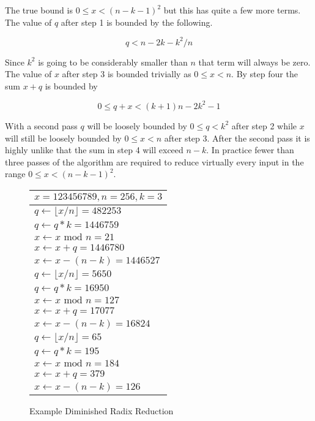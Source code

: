 \documentclass[b5paper]{book}
\begin{document}
The true bound is  $0 \le x < (n - k - 1)^2$ but this has quite a few more terms.  The value of $q$ after step 1 is bounded by the following.

\begin{equation}
q < n - 2k - k^2/n
\end{equation}

Since $k^2$ is going to be considerably smaller than $n$ that term will always be zero.  The value of $x$ after step 3 is bounded trivially as
$0 \le x < n$.  By step four the sum $x + q$ is bounded by 

\begin{equation}
0 \le q + x < (k + 1)n - 2k^2 - 1
\end{equation}

With a second pass $q$ will be loosely bounded by $0 \le q < k^2$ after step 2 while $x$ will still be loosely bounded by $0 \le x < n$ after step 3.  After the second pass it is highly unlike that the
sum in step 4 will exceed $n - k$.  In practice fewer than three passes of the algorithm are required to reduce virtually every input in the 
range $0 \le x < (n - k - 1)^2$.  

\begin{figure}
\begin{small}
\begin{center}
\begin{tabular}{|l|}
\hline
$x = 123456789, n = 256, k = 3$ \\
\hline $q \leftarrow \lfloor x/n \rfloor = 482253$ \\
$q \leftarrow q*k = 1446759$ \\
$x \leftarrow x \mbox{ mod } n = 21$ \\
$x \leftarrow x + q = 1446780$ \\
$x \leftarrow x - (n - k) = 1446527$ \\
\hline 
$q \leftarrow \lfloor x/n \rfloor = 5650$ \\
$q \leftarrow q*k = 16950$ \\
$x \leftarrow x \mbox{ mod } n = 127$ \\
$x \leftarrow x + q = 17077$ \\
$x \leftarrow x - (n - k) = 16824$ \\
\hline 
$q \leftarrow \lfloor x/n \rfloor = 65$ \\
$q \leftarrow q*k = 195$ \\
$x \leftarrow x \mbox{ mod } n = 184$ \\
$x \leftarrow x + q = 379$ \\
$x \leftarrow x - (n - k) = 126$ \\
\hline
\end{tabular}
\end{center}
\end{small}
\caption{Example Diminished Radix Reduction}
\label{fig:EXDR}
\end{figure}
\end{document}
